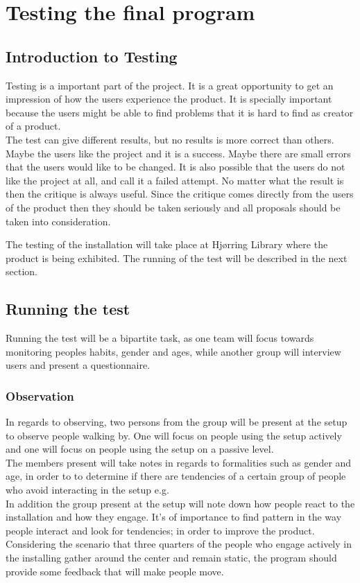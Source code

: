 \chapter{Testing the final program}
\section{Introduction to Testing}
Testing is a important part of the project. It is a great opportunity to get an impression of how the users experience the product. It is specially important because the users might be able to find problems that it is hard to find as creator of a product. \\
The test can give different results, but no results is more correct than others. Maybe the users like the project and it is a success. Maybe there are small errors that the users would like to be changed. It is also possible that the users do not like the project at all, and call it a failed attempt. No matter what the result is then the critique is always useful. Since the critique comes directly from the users of the product then they should be taken seriously and all proposals should be taken into consideration. 

The testing of the installation will take place at Hj{\o}rring Library where the product is being exhibited. The running of the test will be described in the next section.

\section{Running the test}
Running the test will be a bipartite task, as one team will focus towards monitoring peoples habits, gender and ages, while another group will interview users and present a questionnaire.
\subsection{Observation}
In regards to observing, two persons from the group will be present at the setup to observe people walking by. One will focus on people using the setup actively and one will focus on people using the setup on a passive level.\\
The members present will take notes in regards to formalities such as gender and age, in order to to determine if there are tendencies of a certain group of people who avoid interacting in the setup e.g.\\
In addition the group present at the setup will note down how people react to the installation and how they engage. It's of importance to find pattern in the way people interact and look for tendencies; in order to improve the product. Considering the scenario that three quarters of the people who engage actively in the installing gather around the center and remain static, the program should provide some feedback that will make people move.

